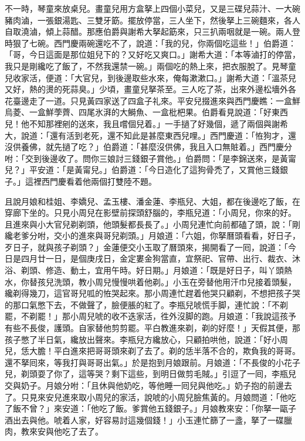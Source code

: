 不一時，琴童來放桌兒。畫童兒用方盒拏上四個小菜兒，又是三碟兒蒜汁、一大碗豬肉滷，一張銀湯匙、三雙牙筯。擺放停當，三人坐下，然後拏上三碗麵來，各人自取澆滷，傾上蒜醋。那應伯爵與謝希大拏起筯來，只三扒兩咽就是一碗。兩人登時狠了七碗。西門慶兩碗還吃不了，說道：「我的兒，你兩個吃這些！」伯爵道：「哥，今日這面是那位姐兒下的？又好吃又爽口。」謝希大道：「本等滷打的停當，我只是剛纔吃了飯了，不然我還禁一碗。」兩個吃的熱上來，把衣服脫了。見琴童兒收家活，便道：「大官兒，到後邊取些水來，俺每漱漱口。」謝希大道：「溫茶兒又好，熱的燙的死蒜臭。」少頃，畫童兒拏茶至。三人吃了茶，出來外邊松墻外各花臺邊走了一道。只見黃四家送了四盒子礼來。平安兒掇進來與西門慶瞧：一盒鮮烏菱、一盒鮮荸薺、四尾氷湃的大鰣魚、一盒枇杷果。伯爵看見說道：「好東西兒！他不知那裡剜的送來，我且嚐個兒着。」一手撾了好幾個，遞了兩個與謝希大，說道：「還有活到老死，還不知此是甚麼東西兒哩。」西門慶道：「恠狗才，還沒供養佛，就先撾了吃？」伯爵道：「甚麼沒供佛，我且入口無賍着。」西門慶分咐：「交到後邊收了。問你三娘討三錢銀子賞他。」伯爵問：「是李錦送來，是黃甯兒？」平安道：「是黃甯兒。」伯爵道：「今日造化了這狗骨禿了，又賞他三錢銀子。」{}這裡西門慶看着他兩個打雙陸不題。

且說月娘和桂姐、李嬌兒、孟玉樓、潘金蓮、李瓶兒、大姐，都在後邊吃了飯，在穿廊下坐的。只見小周兒在影壁前探頭舒腦的，李瓶兒道：「小周兒，你來的好。且進來與小大官兒剃剃頭，他頭髮都長長了。」小周兒連忙向前都磕了頭，說：「剛纔老爹分咐，交小的進來與哥兒剃頭。」月娘道：「六姐，你拏曆頭看看，好日子，歹日子，就與孩子剃頭？」金蓮便交小玉取了曆頭來，揭開看了一囘，說道：「今日是四月廿一日，是個庚戌日，金定婁金狗當直，宜祭祀、官帶、出行、裁衣、沐浴、剃頭、修造、動土，宜用午時。好日期。」月娘道：「既是好日子，叫丫頭熱水，你替孩兒洗頭，教小周兒慢慢哄着他剃。」{}小玉在旁替他用汗巾兒接着頭髮，纔剃得幾刀，這官哥兒呱的恠哭起來。那小周連忙趕着他哭只顧剃，不想把孩子哭的那口氣憋下去，不做聲了，臉便脹的紅了。李瓶兒唬慌手脚，連忙說：「不剃罷，不剃罷！」那小周兒唬的收不迭家活，徃外沒脚的跑。月娘道：「我說這孩予有些不長俊，護頭。自家替他剪剪罷。平白教進來剃，剃的好麼！」天假其便，那孩子憋了半日氣，纔放出聲來。李瓶兒方纔放心，只顧拍哄他，說道：「好小周兒，恁大膽！平白進來把哥哥頭來剃了去了。剃的恁半落不合的，欺負我的哥哥。還不拏囘來，等我打與哥哥出氣。」{}於是抱到月娘跟前。月娘道：「不長俊的小花子兒，剃頭耍了你了，這等哭？剩下這些，到明日做剪毛賊。」引逗了一囘，李瓶兒交與奶子。月娘分咐：「且休與他奶吃，等他睡一囘兒與他吃。」奶子抱的前邊去了。只見來安兒進來取小周兒的家活，說唬的小周兒臉焦黃的。月娘問道：「他吃了飯不曾？」來安道：「他吃了飯。爹賞他五錢銀子。」月娘教來安：「你拏一甌子酒出去與他。唬着人家，好容易討這幾個錢！」小玉連忙篩了一盞，拏了一碟臘肉，教來安與他吃了去了。

